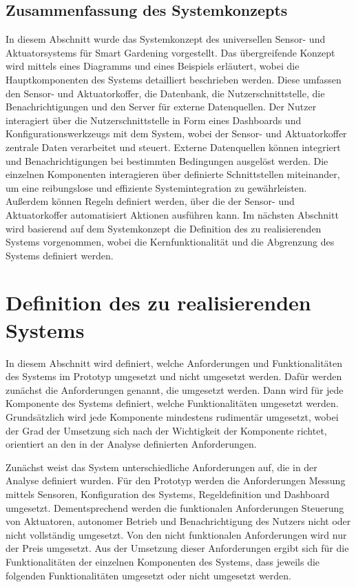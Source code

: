 \subsection{Zusammenfassung des Systemkonzepts}
In diesem Abschnitt wurde das Systemkonzept des universellen Sensor- und Aktuatorsystems für Smart Gardening vorgestellt.
Das übergreifende Konzept wird mittels eines Diagramms und eines Beispiels erläutert, wobei die Hauptkomponenten des Systems detailliert beschrieben werden.
Diese umfassen den Sensor- und Aktuatorkoffer, die Datenbank, die Nutzerschnittstelle, die Benachrichtigungen und den Server für externe Datenquellen.
Der Nutzer interagiert über die Nutzerschnittstelle in Form eines Dashboards und Konfigurationswerkzeugs mit dem System, wobei der Sensor- und Aktuatorkoffer zentrale Daten verarbeitet und steuert.
Externe Datenquellen können integriert und Benachrichtigungen bei bestimmten Bedingungen ausgelöst werden.
Die einzelnen Komponenten interagieren über definierte Schnittstellen miteinander, um eine reibungslose und effiziente Systemintegration zu gewährleisten.
Außerdem können Regeln definiert werden, über die der Sensor- und Aktuatorkoffer automatisiert Aktionen ausführen kann.
Im nächsten Abschnitt wird basierend auf dem Systemkonzept die Definition des zu realisierenden Systems vorgenommen, wobei die Kernfunktionalität und die Abgrenzung des Systems definiert werden.



\section{Definition des zu realisierenden Systems}\label{sec:realisieren}
In diesem Abschnitt wird definiert, welche Anforderungen und Funktionalitäten des Systems im Prototyp umgesetzt und nicht umgesetzt werden.
Dafür werden zunächst die Anforderungen genannt, die umgesetzt werden.
Dann wird für jede Komponente des Systems definiert, welche Funktionalitäten umgesetzt werden.
Grundsätzlich wird jede Komponente mindestens rudimentär umgesetzt, wobei der Grad der Umsetzung sich nach der Wichtigkeit der Komponente richtet, orientiert an den in der Analyse definierten Anforderungen.

Zunächst weist das System unterschiedliche Anforderungen auf, die in der Analyse definiert wurden.
Für den Prototyp werden die Anforderungen Messung mittels Sensoren, Konfiguration des Systems, Regeldefinition und Dashboard umgesetzt.
Dementsprechend werden die funktionalen Anforderungen Steuerung von Aktuatoren, autonomer Betrieb und Benachrichtigung des Nutzers nicht oder nicht vollständig umgesetzt.
Von den nicht funktionalen Anforderungen wird nur der Preis umgesetzt.
Aus der Umsetzung dieser Anforderungen ergibt sich für die Funktionalitäten der einzelnen Komponenten des Systems, dass jeweils die folgenden Funktionalitäten umgesetzt oder nicht umgesetzt werden.

